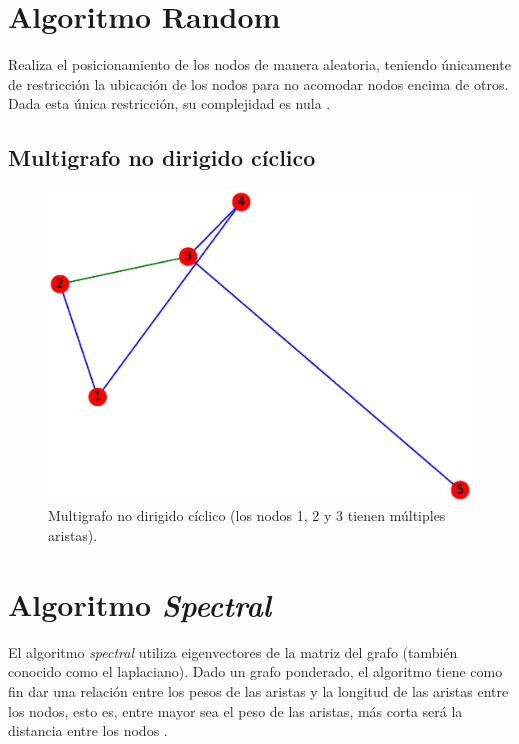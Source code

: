 \documentclass{article}
\begin{document}
\section{Algoritmo Random}
Realiza el posicionamiento de los nodos de manera aleatoria, teniendo únicamente de restricción la ubicación de los nodos para no acomodar nodos encima de otros. Dada esta única restricción, su complejidad es nula \cite{random}.

\subsection{Multigrafo no dirigido cíclico}
\begin{figure}[H]
    \includegraphics[width=\textwidth]{8-MNDC}
    \caption{Multigrafo no dirigido cíclico (los nodos 1, 2 y 3 tienen múltiples aristas).}
    \label{fig:MNDC}
\end{figure}

\section{Algoritmo \textit{Spectral}}
El algoritmo \textit{spectral} utiliza eigenvectores de la matriz del grafo (también conocido como el laplaciano). Dado un grafo ponderado, el algoritmo tiene como fin dar una relación entre los pesos de las aristas y la longitud de las aristas entre los nodos, esto es, entre mayor sea el peso de las aristas, más corta será la distancia entre los nodos \cite{spectral}.
\end{document}
